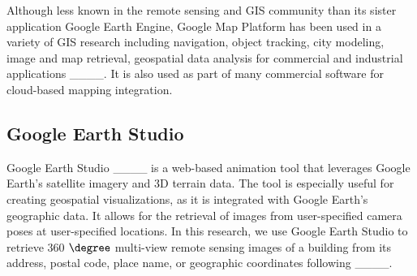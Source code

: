 Although less known in the remote sensing and GIS community than its sister application Google Earth Engine, Google Map Platform has been used in a variety of GIS research including navigation, object tracking, city modeling, image and map retrieval, geospatial data analysis for commercial and industrial applications ____. It is also used as part of many commercial software for cloud-based mapping integration. 

\subsection{Google Earth Studio}
Google Earth Studio ____ is a web-based animation tool that leverages Google Earth's satellite imagery and 3D terrain data. The tool is especially useful for creating geospatial visualizations, as it is integrated with Google Earth’s geographic data. It allows for the retrieval of images from user-specified camera poses at user-specified locations. In this research, we use Google Earth Studio to retrieve 360 $\degree$ multi-view remote sensing images of a building from its address, postal code, place name, or geographic coordinates following ____.



%
